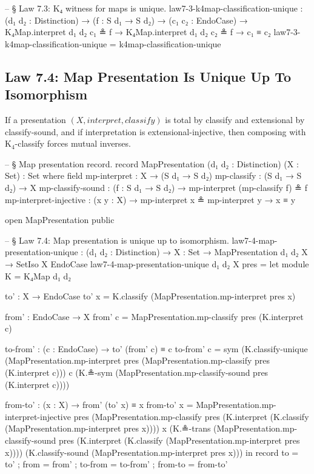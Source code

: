 \documentclass[11pt,a4paper]{book}
\def\texttt#1{#1}%
\def\text#1{#1}%
\begin{document}
\begin{code}
-- § Law 7.3: K₄ witness for maps is unique.
law7-3-k4map-classification-unique :
  (d₁ d₂ : Distinction) →
  (f : S d₁ → S d₂) →
  (c₁ c₂ : EndoCase) →
  K₄Map.interpret d₁ d₂ c₁ ≗ f →
  K₄Map.interpret d₁ d₂ c₂ ≗ f →
  c₁ ≡ c₂
law7-3-k4map-classification-unique = k4map-classification-unique
\end{code}

\subsection{Law 7.4: Map Presentation Is Unique Up To Isomorphism}

If a presentation $(X, \text{interpret}, \text{classify})$ is total by \texttt{classify} and extensional by \texttt{classify-sound}, and if interpretation is extensional-injective, then composing with K$_4$-classify forces mutual inverses.

\begin{code}
-- § Map presentation record.
record MapPresentation (d₁ d₂ : Distinction) (X : Set) : Set where
  field
    mp-interpret            : X → (S d₁ → S d₂)
    mp-classify             : (S d₁ → S d₂) → X
    mp-classify-sound       : (f : S d₁ → S d₂) → mp-interpret (mp-classify f) ≗ f
    mp-interpret-injective  : (x y : X) → mp-interpret x ≗ mp-interpret y → x ≡ y

open MapPresentation public

-- § Law 7.4: Map presentation is unique up to isomorphism.
law7-4-map-presentation-unique :
  (d₁ d₂ : Distinction) →
  {X : Set} →
  MapPresentation d₁ d₂ X →
  SetIso X EndoCase
law7-4-map-presentation-unique d₁ d₂ {X} pres =
  let
    module K = K₄Map d₁ d₂

    to' : X → EndoCase
    to' x = K.classify (MapPresentation.mp-interpret pres x)

    from' : EndoCase → X
    from' c = MapPresentation.mp-classify pres (K.interpret c)

    to-from' : (c : EndoCase) → to' (from' c) ≡ c
    to-from' c =
      sym
        (K.classify-unique
          (MapPresentation.mp-interpret pres (MapPresentation.mp-classify pres (K.interpret c)))
          c
          (K.≗-sym (MapPresentation.mp-classify-sound pres (K.interpret c))))

    from-to' : (x : X) → from' (to' x) ≡ x
    from-to' x =
      MapPresentation.mp-interpret-injective pres
        (MapPresentation.mp-classify pres (K.interpret (K.classify (MapPresentation.mp-interpret pres x))))
        x
        (K.≗-trans
          (MapPresentation.mp-classify-sound pres (K.interpret (K.classify (MapPresentation.mp-interpret pres x))))
          (K.classify-sound (MapPresentation.mp-interpret pres x)))
  in
  record
    { to = to'
    ; from = from'
    ; to-from = to-from'
    ; from-to = from-to'
    }
\end{code}
\end{document}
